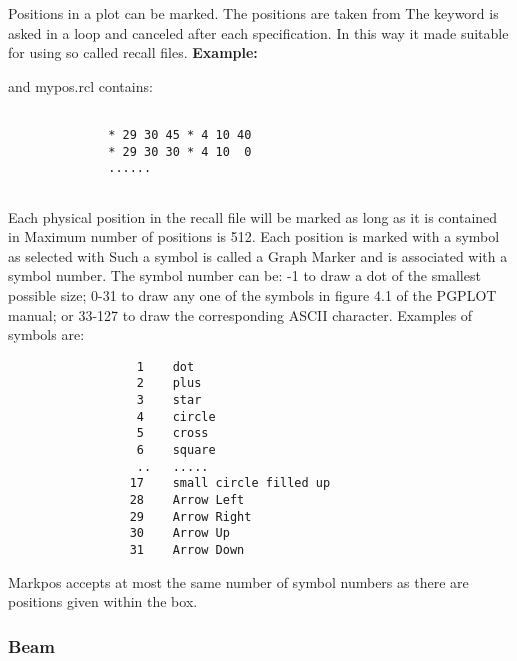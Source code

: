 Positions in a plot can be marked. The positions are taken
from  The keyword is asked in a loop and canceled
after each specification. In this way it made suitable for
using so called recall files.   
{\bf Example:} 
              
              and mypos.rcl  contains:
\begin{verbatim}
              
              * 29 30 45 * 4 10 40
              * 29 30 30 * 4 10  0
              ......
              
\end{verbatim}

Each physical position in the recall file will be marked
as long as it is contained in  Maximum number of
positions is 512. Each position is marked with a symbol as
selected with  Such a symbol is called a Graph
Marker and is associated with a symbol number. The symbol
number can be: -1 to draw a dot of the smallest possible
size; 0-31 to draw any one of the symbols in figure 4.1 of
the PGPLOT manual; or 33-127 to draw the corresponding
ASCII character. Examples of symbols are: 

\begin{verbatim}              
                  1    dot
                  2    plus
                  3    star
                  4    circle
                  5    cross
                  6    square
                  ..   .....
                 17    small circle filled up
                 28    Arrow Left 
                 29    Arrow Right 
                 30    Arrow Up
                 31    Arrow Down 
\end{verbatim}

Markpos accepts at most the same number of symbol numbers as
there are positions given within the box. 
              
              
\subsubsection*{Beam}
              
